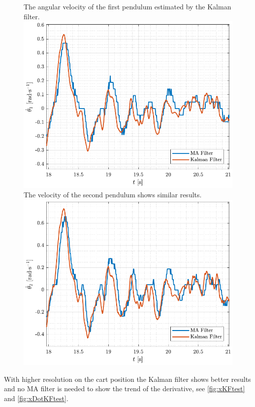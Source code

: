 \begin{figure}[H]
  \hspace{-10pt}
  \captionbox
  {
    The angular velocity of the first pendulum estimated by the Kalman filter.
    \label{fig:theta1DotKFtest}
  }
  {
    \hspace{-1cm}
    \includegraphics[width=.5\textwidth]{figures/theta1DotKFtest}
  }
  \hspace{20pt}
  \captionbox 
  {
    The velocity of the second pendulum shows similar results. 
    \label{fig:theta2DotKFtest}
  }
  {
    \hspace{-1cm}
    \includegraphics[width=.5\textwidth]{figures/theta2DotKFtest}
  }  
\end{figure}
%
With higher resolution on the cart position the Kalman filter shows better results and no MA filter is needed to show the trend of the derivative, see \autoref{fig:xKFtest} and \ref{fig:xDotKFtest}.
%
